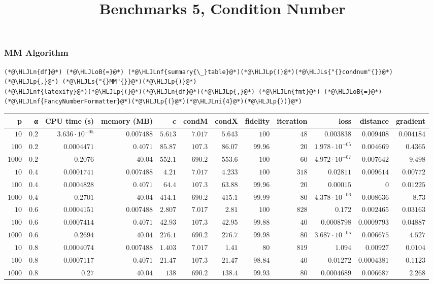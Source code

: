 \documentclass[12pt,a4paper]{article}
\title{ Benchmarks 5, Condition Number }
\newcommand{\HLJLn}[1]{#1}
\newcommand{\HLJLnf}[1]{\textcolor[RGB]{66,102,213}{#1}}
\newcommand{\HLJLs}[1]{\textcolor[RGB]{201,61,57}{#1}}
\newcommand{\HLJLni}[1]{\textcolor[RGB]{59,151,46}{#1}}
\newcommand{\HLJLoB}[1]{\textcolor[RGB]{102,102,102}{\textbf{#1}}}
\newcommand{\HLJLp}[1]{#1}
\begin{document}
\maketitle


\subsubsection{MM Algorithm}

\begin{lstlisting}
(*@\HLJLn{df}@*) (*@\HLJLoB{=}@*) (*@\HLJLnf{summary{\_}table}@*)(*@\HLJLp{(}@*)(*@\HLJLs{"{}condnum"{}}@*)(*@\HLJLp{,}@*) (*@\HLJLs{"{}MM"{}}@*)(*@\HLJLp{)}@*)
(*@\HLJLnf{latexify}@*)(*@\HLJLp{(}@*)(*@\HLJLn{df}@*)(*@\HLJLp{,}@*) (*@\HLJLn{fmt}@*) (*@\HLJLoB{=}@*) (*@\HLJLnf{FancyNumberFormatter}@*)(*@\HLJLp{(}@*)(*@\HLJLni{4}@*)(*@\HLJLp{))}@*)
\end{lstlisting}


\begin{tabular}
{r | r | r | r | r | r | r | r | r | r | r | r}
p & α & CPU time (s) & memory (MB) & c & condM & condX & fidelity & iteration & loss & distance & gradient \\
\hline
$10$ & $0.2$ & $3.636 \cdot 10^{-05}$ & $0.007488$ & $5.613$ & $7.017$ & $5.643$ & $100$ & $48$ & $0.003838$ & $0.009408$ & $0.004184$ \\
$100$ & $0.2$ & $0.0004471$ & $0.4071$ & $85.87$ & $107.3$ & $86.07$ & $99.96$ & $20$ & $1.978 \cdot 10^{-05}$ & $0.004669$ & $0.4365$ \\
$1000$ & $0.2$ & $0.2076$ & $40.04$ & $552.1$ & $690.2$ & $553.6$ & $100$ & $60$ & $4.972 \cdot 10^{-07}$ & $0.007642$ & $9.498$ \\
$10$ & $0.4$ & $0.0001741$ & $0.007488$ & $4.21$ & $7.017$ & $4.233$ & $100$ & $318$ & $0.02811$ & $0.009614$ & $0.00772$ \\
$100$ & $0.4$ & $0.0004828$ & $0.4071$ & $64.4$ & $107.3$ & $63.88$ & $99.96$ & $20$ & $0.00015$ & $0$ & $0.01225$ \\
$1000$ & $0.4$ & $0.2701$ & $40.04$ & $414.1$ & $690.2$ & $415.1$ & $99.99$ & $80$ & $4.378 \cdot 10^{-06}$ & $0.008636$ & $8.73$ \\
$10$ & $0.6$ & $0.0004151$ & $0.007488$ & $2.807$ & $7.017$ & $2.81$ & $100$ & $828$ & $0.172$ & $0.002465$ & $0.03163$ \\
$100$ & $0.6$ & $0.0007414$ & $0.4071$ & $42.93$ & $107.3$ & $42.95$ & $99.88$ & $40$ & $0.0008798$ & $0.0009793$ & $0.04887$ \\
$1000$ & $0.6$ & $0.2694$ & $40.04$ & $276.1$ & $690.2$ & $276.7$ & $99.98$ & $80$ & $3.687 \cdot 10^{-05}$ & $0.006675$ & $4.527$ \\
$10$ & $0.8$ & $0.0004074$ & $0.007488$ & $1.403$ & $7.017$ & $1.41$ & $80$ & $819$ & $1.094$ & $0.00927$ & $0.0104$ \\
$100$ & $0.8$ & $0.0007117$ & $0.4071$ & $21.47$ & $107.3$ & $21.47$ & $98.84$ & $40$ & $0.01272$ & $0.0004381$ & $0.1123$ \\
$1000$ & $0.8$ & $0.27$ & $40.04$ & $138$ & $690.2$ & $138.4$ & $99.93$ & $80$ & $0.0004689$ & $0.006687$ & $2.268$ \\
\end{tabular}
\end{document}
